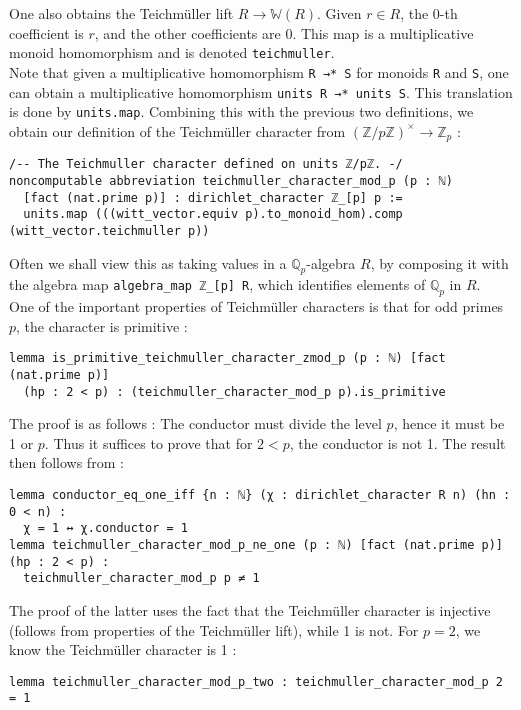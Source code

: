 \documentclass[a4paper,UKenglish,cleveref, autoref, thm-restate]{lipics-v2021}
\newcommand{\lean}[1]{\texttt{#1}\xspace} %
\begin{document}
One also obtains the Teichmüller lift $R \to \mathbb{W} (R)$. Given $r \in R$, 
the 0-th coefficient is $r$, and the other coefficients are 0. This map is a 
multiplicative monoid homomorphism and is denoted \lean{teichmuller}. \\

Note that given a multiplicative homomorphism \lean{R →* S} for monoids \lean{R} 
and \lean{S}, one can obtain a multiplicative homomorphism \lean{units R →* units S}. 
This translation is done by \lean{units.map}. Combining this with the previous two 
definitions, we obtain our definition of the Teichmüller character from 
$(\mathbb{Z}/p \mathbb{Z})^{\times} \to \mathbb{Z}_p$ :
\begin{lstlisting}
/-- The Teichmuller character defined on units ℤ/pℤ. -/
noncomputable abbreviation teichmuller_character_mod_p (p : ℕ) 
  [fact (nat.prime p)] : dirichlet_character ℤ_[p] p :=
  units.map (((witt_vector.equiv p).to_monoid_hom).comp (witt_vector.teichmuller p))
\end{lstlisting}

Often we shall view this as taking values in a $\mathbb{Q}_p$-algebra $R$, by composing it 
with the algebra map \lean{algebra\_map ℤ\_[p] R}, which identifies elements of $\mathbb{Q}_p$ 
in $R$. \\

One of the important properties of Teichmüller characters is that for odd primes $p$, the character is 
primitive : 
\begin{lstlisting}
lemma is_primitive_teichmuller_character_zmod_p (p : ℕ) [fact (nat.prime p)] 
  (hp : 2 < p) : (teichmuller_character_mod_p p).is_primitive
\end{lstlisting}
The proof is as follows : The conductor must divide the level $p$, hence it must be 1 or $p$. Thus it 
suffices to prove that for $2 < p$, the conductor is not 1. The result then follows from : 
\begin{lstlisting}
lemma conductor_eq_one_iff {n : ℕ} (χ : dirichlet_character R n) (hn : 0 < n) : 
  χ = 1 ↔ χ.conductor = 1 
lemma teichmuller_character_mod_p_ne_one (p : ℕ) [fact (nat.prime p)] (hp : 2 < p) :
  teichmuller_character_mod_p p ≠ 1
\end{lstlisting}
The proof of the latter uses the fact that the Teichmüller character is injective (follows from 
properties of the Teichmüller lift), while 1 is not. For $p = 2$, we know the Teichmüller character is 1 : 
\begin{lstlisting}
lemma teichmuller_character_mod_p_two : teichmuller_character_mod_p 2 = 1
\end{lstlisting}
\end{document}
